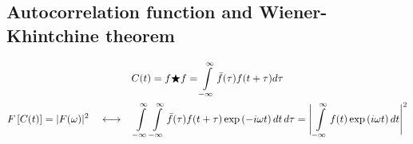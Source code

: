\documentclass[14pt]{article}
\newcommand{\lb}{\left(}
\newcommand{\rb}{\right)}
\newcommand{\intty}{\int\limits_{-\infty}^{\infty}}
\begin{document}
\subsection*{Autocorrelation function and Wiener-Khintchine theorem}

\begin{gather}
C(t) = f \bigstar f = \intty \bar{f}(\tau) f(t + \tau) d \tau \notag \\
F \left[ C(t) \right] = | F (\omega) |^2 \quad \longleftrightarrow \quad \intty \intty \bar{f}(\tau) f(t + \tau) \exp \lb - i \omega t \rb d t \, d \tau = \Bigg{|} \intty f(t) \exp \lb i \omega t \rb dt \Bigg{|}^2 \notag
\end{gather}
\end{document}
